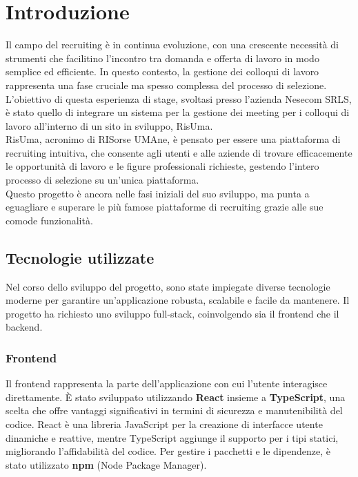 \chapter*{Introduzione}  

Il campo del recruiting è in continua evoluzione, con una crescente necessità di strumenti 
che facilitino l'incontro tra domanda e offerta di lavoro in modo semplice ed efficiente. 
In questo contesto, la gestione dei colloqui di lavoro rappresenta una fase cruciale ma spesso 
complessa del processo di selezione. 
\\
L'obiettivo di questa esperienza di stage, svoltasi presso l'azienda Nesecom SRLS, 
è stato quello di integrare un sistema per la gestione dei meeting per i colloqui di lavoro 
all'interno di un sito in sviluppo, RisUma.
\\ 
RisUma, acronimo di RISorse UMAne, è pensato per essere una piattaforma di recruiting intuitiva, 
che consente agli utenti e alle aziende di trovare efficacemente le opportunità di lavoro e 
le figure professionali richieste, gestendo l'intero processo di selezione su un'unica piattaforma.
\\
Questo progetto è ancora nelle fasi iniziali del suo sviluppo, ma punta a eguagliare 
e superare le più famose piattaforme di recruiting grazie alle sue comode funzionalità.

\section*{Tecnologie utilizzate}
Nel corso dello sviluppo del progetto, sono state impiegate diverse tecnologie 
moderne per garantire un'applicazione robusta, scalabile e facile da mantenere. 
Il progetto ha richiesto uno sviluppo full-stack, coinvolgendo sia il frontend che il backend.

\subsection*{Frontend} 
Il frontend rappresenta la parte dell'applicazione con cui l'utente interagisce direttamente. 
È stato sviluppato utilizzando \textbf{React} insieme a \textbf{TypeScript}, una scelta che offre vantaggi 
significativi in termini di sicurezza e manutenibilità del codice. React è una libreria 
JavaScript per la creazione di interfacce utente dinamiche e reattive, mentre TypeScript 
aggiunge il supporto per i tipi statici, migliorando l'affidabilità del codice. Per gestire 
i pacchetti e le dipendenze, è stato utilizzato \textbf{npm} (Node Package Manager).

